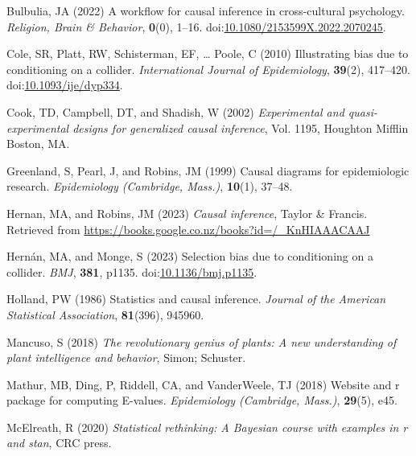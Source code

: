 \documentclass[
  singlecolumn]{article}
\newlength{\cslhangindent}
\newenvironment{CSLReferences}[2] %
 {\begin{list}{}{%
  \setlength{\itemindent}{0pt}
  \setlength{\leftmargin}{0pt}
  \setlength{\parsep}{0pt}
  \ifodd #1
   \setlength{\leftmargin}{\cslhangindent}
   \setlength{\itemindent}{-1\cslhangindent}
  \fi
  \setlength{\itemsep}{#2\baselineskip}}}
 {\end{list}}
\begin{document}
\label{refs}
\begin{CSLReferences}{1}{0}
Bulbulia, JA (2022) A workflow for causal inference in cross-cultural
psychology. \emph{Religion, Brain \& Behavior}, \textbf{0}(0), 1--16.
doi:\href{https://doi.org/10.1080/2153599X.2022.2070245}{10.1080/2153599X.2022.2070245}.

Cole, SR, Platt, RW, Schisterman, EF, \ldots{} Poole, C (2010)
Illustrating bias due to conditioning on a collider. \emph{International
Journal of Epidemiology}, \textbf{39}(2), 417--420.
doi:\href{https://doi.org/10.1093/ije/dyp334}{10.1093/ije/dyp334}.

Cook, TD, Campbell, DT, and Shadish, W (2002) \emph{Experimental and
quasi-experimental designs for generalized causal inference}, Vol. 1195,
Houghton Mifflin Boston, MA.

Greenland, S, Pearl, J, and Robins, JM (1999) Causal diagrams for
epidemiologic research. \emph{Epidemiology (Cambridge, Mass.)},
\textbf{10}(1), 37--48.

Hernan, MA, and Robins, JM (2023) \emph{Causal inference}, Taylor \&
Francis. Retrieved from
\url{https://books.google.co.nz/books?id=/_KnHIAAACAAJ}

Hernán, MA, and Monge, S (2023) Selection bias due to conditioning on a
collider. \emph{BMJ}, \textbf{381}, p1135.
doi:\href{https://doi.org/10.1136/bmj.p1135}{10.1136/bmj.p1135}.

Holland, PW (1986) Statistics and causal inference. \emph{Journal of the
American Statistical Association}, \textbf{81}(396), 945960.

Mancuso, S (2018) \emph{The revolutionary genius of plants: A new
understanding of plant intelligence and behavior}, Simon; Schuster.

Mathur, MB, Ding, P, Riddell, CA, and VanderWeele, TJ (2018) Website and
r package for computing {E}-values. \emph{Epidemiology (Cambridge,
Mass.)}, \textbf{29}(5), e45.

McElreath, R (2020) \emph{Statistical rethinking: A {B}ayesian course
with examples in r and stan}, CRC press.


\end{CSLReferences}
\end{document}
